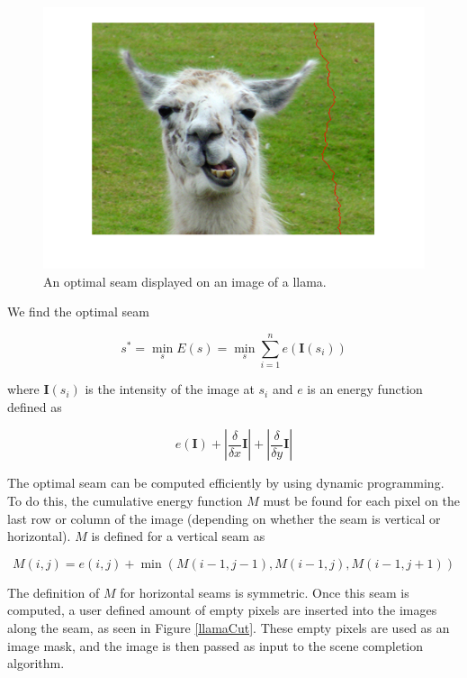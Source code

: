 \documentclass[11pt]{amsart}
\begin{document}
\begin{figure}[htbp]
\begin{center}
\includegraphics[scale=.38]{seam.png}
\caption{An optimal seam displayed on an image of a llama.}
\label{llamaSeam}
\end{center}
\end{figure}


We find the optimal seam  

$$ 
s^* = \min_s E(s) = \min_s \sum^n_{i=1} e(\mathbf{I}(s_i))
$$

where $\mathbf{I}(s_i)$ is the intensity of the image at $s_i$ and $e$ is an energy function defined as

$$
e(\mathbf{I}) + |\frac{\delta}{\delta x} \mathbf{I} | + | \frac{\delta}{\delta y} \mathbf{I} |
$$ 

The optimal seam can be computed efficiently by using dynamic programming. To do this, the cumulative energy function $M$ must be found for each pixel on the last row or column of the image (depending on
whether the seam is vertical or horizontal). $M$ is defined for a vertical seam as

$$
M(i,j) = e(i,j) + \min(M(i-1,j-1), M(i-1, j), M(i-1, j+1))
$$

The definition of $M$ for horizontal seams is symmetric. Once this seam is computed, a user defined amount
of empty pixels are inserted into the images along the seam, as seen in Figure \ref{llamaCut}. These empty pixels are used as an image mask, and the image is then passed as input to the scene completion algorithm.
\end{document}
